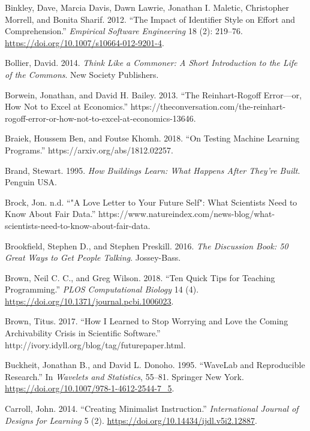 \documentclass[
]{krantz}
\newlength{\cslhangindent}
\newenvironment{cslreferences}%
  {\setlength{\parindent}{0pt}%
  \everypar{\setlength{\hangindent}{\cslhangindent}}\ignorespaces}%
  {\par}
\begin{document}
\begin{cslreferences}
\leavevmode\hypertarget{ref-Bink2012}{}%
Binkley, Dave, Marcia Davis, Dawn Lawrie, Jonathan I. Maletic, Christopher Morrell, and Bonita Sharif. 2012. ``The Impact of Identifier Style on Effort and Comprehension.'' \emph{Empirical Software Engineering} 18 (2): 219--76. \url{https://doi.org/10.1007/s10664-012-9201-4}.

\leavevmode\hypertarget{ref-Boll2014}{}%
Bollier, David. 2014. \emph{Think Like a Commoner: A Short Introduction to the Life of the Commons}. New Society Publishers.

\leavevmode\hypertarget{ref-Borw2013}{}%
Borwein, Jonathan, and David H. Bailey. 2013. ``The Reinhart-Rogoff Error---or, How Not to Excel at Economics.'' https://theconversation.com/the-reinhart-rogoff-error-or-how-not-to-excel-at-economics-13646.

\leavevmode\hypertarget{ref-Brai2018}{}%
Braiek, Houssem Ben, and Foutse Khomh. 2018. ``On Testing Machine Learning Programs.'' https://arxiv.org/abs/1812.02257.

\leavevmode\hypertarget{ref-Bran1995}{}%
Brand, Stewart. 1995. \emph{How Buildings Learn: What Happens After They're Built}. Penguin USA.

\leavevmode\hypertarget{ref-Broc2019}{}%
Brock, Jon. n.d. ``"A Love Letter to Your Future Self": What Scientists Need to Know About Fair Data.'' https://www.natureindex.com/news-blog/what-scientists-need-to-know-about-fair-data.

\leavevmode\hypertarget{ref-Broo2016}{}%
Brookfield, Stephen D., and Stephen Preskill. 2016. \emph{The Discussion Book: 50 Great Ways to Get People Talking}. Jossey-Bass.

\leavevmode\hypertarget{ref-Brow2018}{}%
Brown, Neil C. C., and Greg Wilson. 2018. ``Ten Quick Tips for Teaching Programming.'' \emph{PLOS Computational Biology} 14 (4). \url{https://doi.org/10.1371/journal.pcbi.1006023}.

\leavevmode\hypertarget{ref-Brown2017}{}%
Brown, Titus. 2017. ``How I Learned to Stop Worrying and Love the Coming Archivability Crisis in Scientific Software.'' http://ivory.idyll.org/blog/tag/futurepaper.html.

\leavevmode\hypertarget{ref-Buck1995}{}%
Buckheit, Jonathan B., and David L. Donoho. 1995. ``WaveLab and Reproducible Research.'' In \emph{Wavelets and Statistics}, 55--81. Springer New York. \url{https://doi.org/10.1007/978-1-4612-2544-7_5}.

\leavevmode\hypertarget{ref-Carr2014}{}%
Carroll, John. 2014. ``Creating Minimalist Instruction.'' \emph{International Journal of Designs for Learning} 5 (2). \url{https://doi.org/10.14434/ijdl.v5i2.12887}.


\end{cslreferences}
\end{document}
